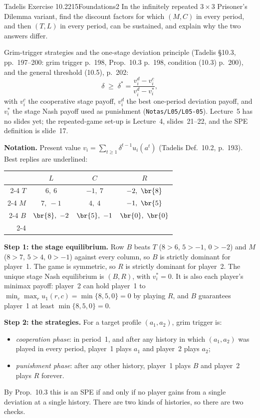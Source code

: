 \begin{exsol}{Tadelis Exercise 10.2}{215}{Foundations}{2}
\asked In the infinitely repeated $3\times3$ Prisoner's Dilemma variant, find the discount factors
for which $(M,C)$ in every period, and then $(T,L)$ in every period, can be sustained, and explain
why the two answers differ.

\method Grim-trigger strategies and the one-stage deviation principle (Tadelis \S10.3,
pp.~197--200: grim trigger p.~198, Prop.~10.3 p.~198, condition (10.3) p.~200), and the general
threshold (10.5), p.~202:
\[
  \delta \;\ge\; \delta^* = \frac{v_i^d - v_i^c}{v_i^d - v_i^*},
\]
with $v_i^c$ the cooperative stage payoff, $v_i^d$ the best one-period deviation payoff, and $v_i^*$
the stage Nash payoff used as punishment (\texttt{Notas/L05/L05-05}). Lecture~5 has no slides yet; the
repeated-game set-up is Lecture~4, slides~21--22, and the SPE definition is slide~17.

\solution
\textbf{Notation.} Present value $v_i = \sum_{t\ge1}\delta^{t-1}u_i(a^t)$ (Tadelis Def.~10.2,
p.~193). Best replies are underlined:
\begin{center}
\begin{tabular}{r|c|c|c|}
\multicolumn{1}{r}{} & \multicolumn{1}{c}{$L$} & \multicolumn{1}{c}{$C$} & \multicolumn{1}{c}{$R$}\\ \cline{2-4}
$T$ & $6,\ 6$ & $-1,\ 7$ & $-2,\ \br{8}$ \\ \cline{2-4}
$M$ & $7,\ -1$ & $4,\ 4$ & $-1,\ \br{5}$ \\ \cline{2-4}
$B$ & $\br{8},\ -2$ & $\br{5},\ -1$ & $\br{0},\ \br{0}$ \\ \cline{2-4}
\end{tabular}
\end{center}

\textbf{Step 1: the stage equilibrium.} Row $B$ beats $T$ ($8>6$, $5>-1$, $0>-2$) and $M$ ($8>7$,
$5>4$, $0>-1$) against every column, so $B$ is strictly dominant for player~1. The game is
symmetric, so $R$ is strictly dominant for player~2. The unique stage Nash equilibrium is $(B,R)$,
with $v_i^* = 0$. It is also each player's minimax payoff: player~2 can hold player~1 to
$\min_{c}\max_{r} u_1(r,c) = \min\{8, 5, 0\} = 0$ by playing $R$, and $B$ guarantees player~1 at least
$\min\{8,5,0\} = 0$.

\textbf{Step 2: the strategies.} For a target profile $(a_1, a_2)$, grim trigger is:
\begin{itemize}
  \item \emph{cooperation phase}: in period~1, and after any history in which $(a_1,a_2)$ was played
  in every period, player~1 plays $a_1$ and player~2 plays $a_2$;
  \item \emph{punishment phase}: after any other history, player~1 plays $B$ and player~2 plays $R$
  forever.
\end{itemize}
By Prop.~10.3 this is an SPE if and only if no player gains from a single deviation at a single
history. There are two kinds of histories, so there are two checks.


\end{exsol}
